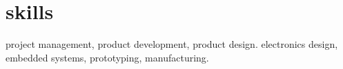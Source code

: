 
\section{skills}
  \vspace{-0.2cm}

project management, product development, product design. electronics design, embedded systems, prototyping, manufacturing.